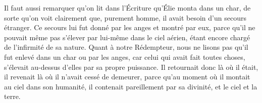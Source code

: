Il faut aussi remarquer qu’on lit dans l’Écriture qu’Élie monta dans un char,
	de sorte qu’on voit clairement que, purement homme,
	il avait besoin d’un secours étranger.
Ce secours lui fut donné par les anges et montré par eux,
	parce qu’il ne pouvait même pas s’élever par lui-même dans le ciel aérien,
	étant encore chargé de l’infirmité de sa nature.
Quant à notre Rédempteur,
	nous ne lisons pas qu’il fut enlevé dans un char ou par les anges,
	car celui qui avait fait toutes choses,
		s’élevait au-dessus d’elles par sa propre puissance.
Il retournait donc là où il était,
	il revenait là où il n’avait cessé de demeurer,
	parce qu’au moment où il montait au ciel dans son humanité,
	il contenait pareillement par sa divinité, et le ciel et la terre.
